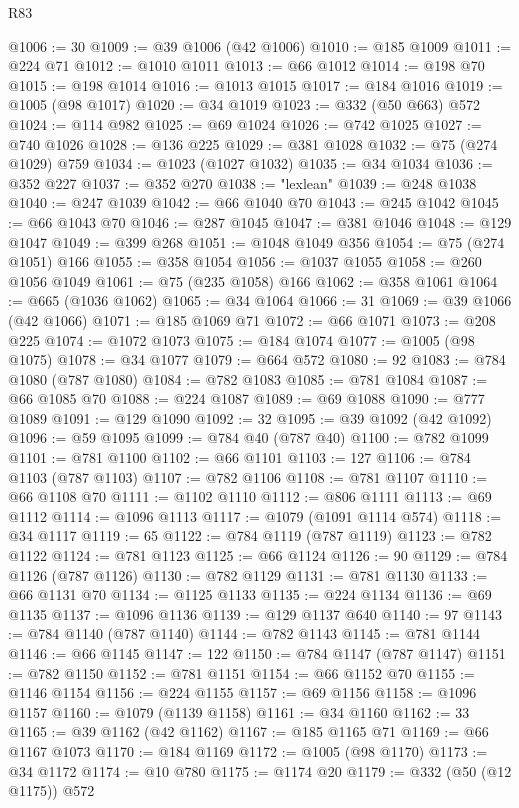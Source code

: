 \begin{lexlean}{R83}
\begin{coremodule}
@1006 := 30
@1009 := @39 @1006 (@42 @1006)
@1010 := @185 @1009
@1011 := @224 @71
@1012 := @1010 @1011
@1013 := @66 @1012
@1014 := @198 @70
@1015 := @198 @1014
@1016 := @1013 @1015
@1017 := @184 @1016
@1019 := @1005 (@98 @1017)
@1020 := @34 @1019
@1023 := @332 (@50 @663) @572
@1024 := @114 @982
@1025 := @69 @1024
@1026 := @742 @1025
@1027 := @740 @1026
@1028 := @136 @225
@1029 := @381 @1028
@1032 := @75 (@274 @1029) @759
@1034 := @1023 (@1027 @1032)
@1035 := @34 @1034
@1036 := @352 @227
@1037 := @352 @270
@1038 := "lexlean"
@1039 := @248 @1038
@1040 := @247 @1039
@1042 := @66 @1040 @70
@1043 := @245 @1042
@1045 := @66 @1043 @70
@1046 := @287 @1045
@1047 := @381 @1046
@1048 := @129 @1047
@1049 := @399 @268
@1051 := @1048 @1049 @356
@1054 := @75 (@274 @1051) @166
@1055 := @358 @1054
@1056 := @1037 @1055
@1058 := @260 @1056 @1049
@1061 := @75 (@235 @1058) @166
@1062 := @358 @1061
@1064 := @665 (@1036 @1062)
@1065 := @34 @1064
@1066 := 31
@1069 := @39 @1066 (@42 @1066)
@1071 := @185 @1069 @71
@1072 := @66 @1071
@1073 := @208 @225
@1074 := @1072 @1073
@1075 := @184 @1074
@1077 := @1005 (@98 @1075)
@1078 := @34 @1077
@1079 := @664 @572
@1080 := 92
@1083 := @784 @1080 (@787 @1080)
@1084 := @782 @1083
@1085 := @781 @1084
@1087 := @66 @1085 @70
@1088 := @224 @1087
@1089 := @69 @1088
@1090 := @777 @1089
@1091 := @129 @1090
@1092 := 32
@1095 := @39 @1092 (@42 @1092)
@1096 := @59 @1095
@1099 := @784 @40 (@787 @40)
@1100 := @782 @1099
@1101 := @781 @1100
@1102 := @66 @1101
@1103 := 127
@1106 := @784 @1103 (@787 @1103)
@1107 := @782 @1106
@1108 := @781 @1107
@1110 := @66 @1108 @70
@1111 := @1102 @1110
@1112 := @806 @1111
@1113 := @69 @1112
@1114 := @1096 @1113
@1117 := @1079 (@1091 @1114 @574)
@1118 := @34 @1117
@1119 := 65
@1122 := @784 @1119 (@787 @1119)
@1123 := @782 @1122
@1124 := @781 @1123
@1125 := @66 @1124
@1126 := 90
@1129 := @784 @1126 (@787 @1126)
@1130 := @782 @1129
@1131 := @781 @1130
@1133 := @66 @1131 @70
@1134 := @1125 @1133
@1135 := @224 @1134
@1136 := @69 @1135
@1137 := @1096 @1136
@1139 := @129 @1137 @640
@1140 := 97
@1143 := @784 @1140 (@787 @1140)
@1144 := @782 @1143
@1145 := @781 @1144
@1146 := @66 @1145
@1147 := 122
@1150 := @784 @1147 (@787 @1147)
@1151 := @782 @1150
@1152 := @781 @1151
@1154 := @66 @1152 @70
@1155 := @1146 @1154
@1156 := @224 @1155
@1157 := @69 @1156
@1158 := @1096 @1157
@1160 := @1079 (@1139 @1158)
@1161 := @34 @1160
@1162 := 33
@1165 := @39 @1162 (@42 @1162)
@1167 := @185 @1165 @71
@1169 := @66 @1167 @1073
@1170 := @184 @1169
@1172 := @1005 (@98 @1170)
@1173 := @34 @1172
@1174 := @10 @780
@1175 := @1174 @20
@1179 := @332 (@50 (@12 @1175)) @572

\end{coremodule}
\end{lexlean}
